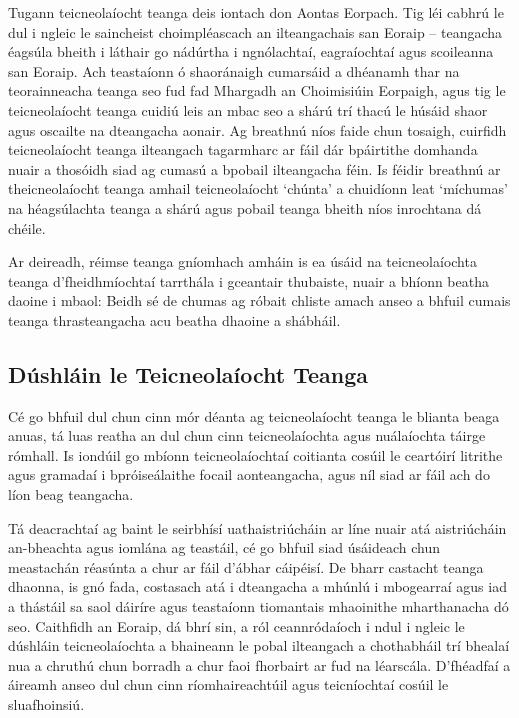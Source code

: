 \begin{multicols}{2}

Tugann teicneolaíocht teanga deis iontach don Aontas Eorpach. Tig léi cabhrú le dul i ngleic le saincheist choimpléascach an ilteangachais san Eoraip – teangacha éagsúla bheith i láthair go nádúrtha i ngnólachtaí, eagraíochtaí agus scoileanna san Eoraip. Ach teastaíonn ó shaoránaigh cumarsáid a dhéanamh thar na teorainneacha teanga seo fud fad Mhargadh an Choimisiúin Eorpaigh, agus tig le teicneolaíocht teanga cuidiú leis an mbac seo a shárú trí thacú le húsáid shaor agus oscailte na dteangacha aonair. Ag breathnú níos faide chun tosaigh, cuirfidh teicneolaíocht teanga ilteangach tagarmharc ar fáil dár bpáirtithe domhanda nuair a thosóidh siad ag cumasú a bpobail ilteangacha féin. Is féidir breathnú ar theicneolaíocht teanga amhail teicneolaíocht ‘chúnta’ a chuidíonn leat ‘míchumas’ na héagsúlachta teanga a shárú agus pobail teanga bheith níos inrochtana dá chéile.

Ar deireadh, réimse teanga gníomhach amháin is ea úsáid na teicneolaíochta teanga d’fheidhmíochtaí tarrthála i gceantair thubaiste, nuair a bhíonn beatha daoine i mbaol: Beidh sé de chumas ag róbait chliste amach anseo a bhfuil cumais teanga thrasteangacha acu beatha dhaoine a shábháil.

\subsection{Dúshláin le Teicneolaíocht Teanga}


Cé go bhfuil dul chun cinn mór déanta ag teicneolaíocht teanga le blianta beaga anuas, tá luas reatha an dul chun cinn teicneolaíochta agus nuálaíochta táirge rómhall. Is iondúil go mbíonn teicneolaíochtaí coitianta cosúil le ceartóirí litrithe agus gramadaí i bpróiseálaithe focail aonteangacha, agus níl siad ar fáil ach do líon beag teangacha. 


Tá deacrachtaí ag baint le seirbhísí uathaistriúcháin ar líne nuair atá aistriúcháin an-bheachta agus iomlána ag teastáil, cé go bhfuil siad úsáideach chun meastachán réasúnta a chur ar fáil d’ábhar cáipéisí. De bharr castacht teanga dhaonna, is gnó fada, costasach atá i dteangacha a mhúnlú i mbogearraí agus iad a thástáil sa saol dáiríre agus teastaíonn tiomantais mhaoinithe mharthanacha dó seo. Caithfidh an Eoraip, dá bhrí sin, a ról ceannródaíoch i ndul i ngleic le dúshláin teicneolaíochta a bhaineann le pobal ilteangach a chothabháil trí bhealaí nua a chruthú chun borradh a chur faoi fhorbairt ar fud na léarscála. D’fhéadfaí a áireamh anseo dul chun cinn ríomhaireachtúil agus teicníochtaí cosúil le sluafhoinsiú.



\end{multicols}
